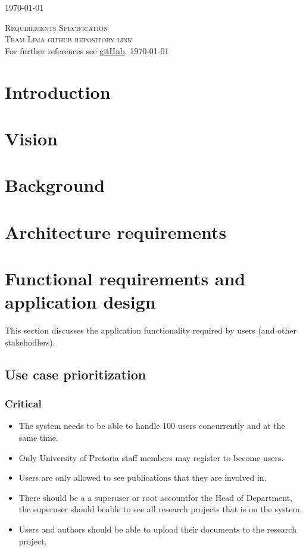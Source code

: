 \documentclass[a4paper,12pt]{report}
\begin{document}
\begin{titlepage}
\begin{center}
{\large \today}
\end{center}
\end{titlepage}
\footnotesize
\normalsize

\renewcommand{\thesection}{\arabic{section}}
\newpage
\begin{center}
\textsc{\LARGE Requirements Specification}\\[1.5cm]
\textsc{\Large Team Lima github repository link}\\[0.5cm]
For further references see \href{https://https://github.com/slugger7/team-lima}{gitHub}.
\today
\end{center}


\newpage
\section{Introduction}

\newpage
\section{Vision}

\newpage
\section{Background}

\newpage
\section{Architecture requirements}

\newpage
\section{Functional requirements and application design}
This section discusses the application functionality required by users (and other stakehodlers).

\subsection{Use case prioritization}
\subsubsection{Critical}
	\begin{itemize}
		\item The system needs to be able to handle 100 users concurrently and at the same time.
		\item Only University of Pretoria staff members may register to become users.
		\item Users are only allowed to see publications that they are involved in.
		\item There should be a a superuser or root accountfor the Head of Department, the superuser should beable to see all research projects that is on the system.
		\item Users and authors should be able to upload their documents to the research project.
	\end{itemize}
\end{document}
